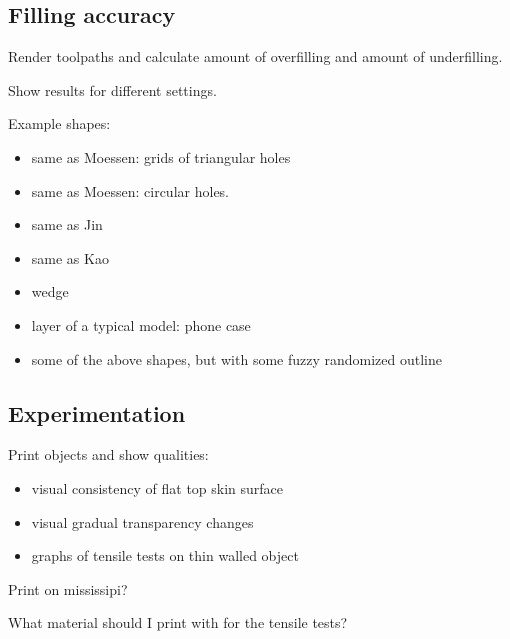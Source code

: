 \subsection{Filling accuracy}
Render toolpaths and calculate amount of overfilling and amount of underfilling.


Show results for different settings.


Example shapes:
\begin{itemize}
\item same as Moessen: grids of triangular holes
\item same as Moessen: circular holes.
\item same as Jin 
\item same as Kao
\item wedge
\item layer of a typical model: phone case
\item some of the above shapes, but with some fuzzy randomized outline
\end{itemize}





\subsection{Experimentation}
Print objects and show qualities:
\begin{itemize}
\item visual consistency of flat top skin surface
\item visual gradual transparency changes
\item graphs of tensile tests on thin walled object
\end{itemize}

Print on mississipi?

What material should I print with for the tensile tests?









